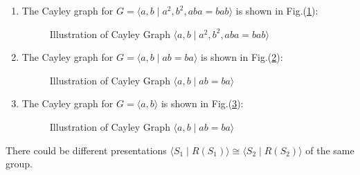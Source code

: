 \begin{example}
\begin{enumerate}
\item
The Cayley graph for $G=\langle a,b\mid a^2,b^2,aba=bab\rangle$ is shown in Fig.(\ref{Fig:11:6}):
\begin{figure}[H]
	\caption{Illustration of Cayley Graph $\langle a,b\mid a^2,b^2,aba=bab\rangle$}
	\label{Fig:11:6}
\end{figure}
\item
The Cayley graph for $G=\langle a,b\mid ab=ba\rangle$ is shown in Fig.(\ref{Fig:11:7:a}):
\begin{figure}[H]
	\caption{Illustration of Cayley Graph $\langle a,b\mid ab=ba\rangle$}
	\label{Fig:11:7:a}
\end{figure}
\item
The Cayley graph for $G=\langle a,b\rangle$ is shown in Fig.(\ref{Fig:11:7:b}):
\begin{figure}[H]
	\caption{Illustration of Cayley Graph $\langle a,b\mid ab=ba\rangle$}
	\label{Fig:11:7:b}
\end{figure}
\end{enumerate}
\end{example}
\begin{remark}
There could be different presentations $\langle S_1\mid R(S_1)\rangle\cong\langle S_2\mid R(S_2)\rangle$ of the same group.
\end{remark}



